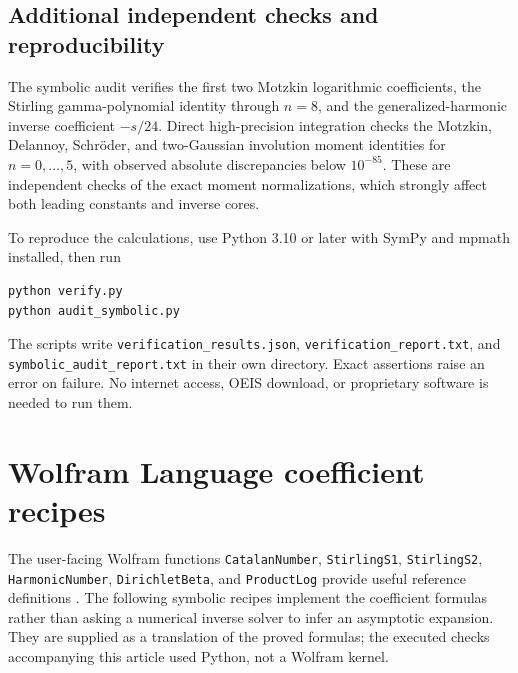 \documentclass[11pt,a4paper]{article}
\numberwithin{equation}{section}
\theoremstyle{definition}
\theoremstyle{remark}
\begin{document}
\subsection{Additional independent checks and reproducibility}

The symbolic audit verifies the first two Motzkin logarithmic coefficients, the Stirling gamma-polynomial identity through $n=8$, and the generalized-harmonic inverse coefficient $-s/24$. Direct high-precision integration checks the Motzkin, Delannoy, Schr\"oder, and two-Gaussian involution moment identities for $n=0,\ldots,5$, with observed absolute discrepancies below $10^{-85}$. These are independent checks of the exact moment normalizations, which strongly affect both leading constants and inverse cores.

To reproduce the calculations, use Python 3.10 or later with SymPy and mpmath installed, then run
\begin{lstlisting}
python verify.py
python audit_symbolic.py
\end{lstlisting}
The scripts write \nolinkurl{verification_results.json}, \nolinkurl{verification_report.txt}, and \nolinkurl{symbolic_audit_report.txt} in their own directory. Exact assertions raise an error on failure. No internet access, OEIS download, or proprietary software is needed to run them.

\clearpage
\section{Wolfram Language coefficient recipes}
\label{app:wolfram}

The user-facing Wolfram functions \texttt{CatalanNumber}, \texttt{StirlingS1}, \texttt{StirlingS2}, \texttt{HarmonicNumber}, \texttt{DirichletBeta}, and \texttt{ProductLog} provide useful reference definitions \cite{wlcatalan,wlstirling1,wlstirling2,wlharmonic,wlbeta,wlproductlog}. The following symbolic recipes implement the coefficient formulas rather than asking a numerical inverse solver to infer an asymptotic expansion. They are supplied as a translation of the proved formulas; the executed checks accompanying this article used Python, not a Wolfram kernel.
\end{document}
